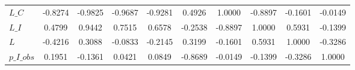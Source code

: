 \begin{center}
\begin{longtable}{lccccccccc}
$L\_C            $	 & 	           -0.8274	 & 	           -0.9825	 & 	           -0.9687	 & 	           -0.9281	 & 	            0.4926	 & 	            1.0000	 & 	           -0.8897	 & 	           -0.1601	 & 	           -0.0149 \\ 
$L\_I            $	 & 	            0.4799	 & 	            0.9442	 & 	            0.7515	 & 	            0.6578	 & 	           -0.2538	 & 	           -0.8897	 & 	            1.0000	 & 	            0.5931	 & 	           -0.1399 \\ 
$L               $	 & 	           -0.4216	 & 	            0.3088	 & 	           -0.0833	 & 	           -0.2145	 & 	            0.3199	 & 	           -0.1601	 & 	            0.5931	 & 	            1.0000	 & 	           -0.3286 \\ 
$p\_I\_obs       $	 & 	            0.1951	 & 	           -0.1361	 & 	            0.0421	 & 	            0.0849	 & 	           -0.8689	 & 	           -0.0149	 & 	           -0.1399	 & 	           -0.3286	 & 	            1.0000 \\ 
\end{longtable}
 \end{center}
